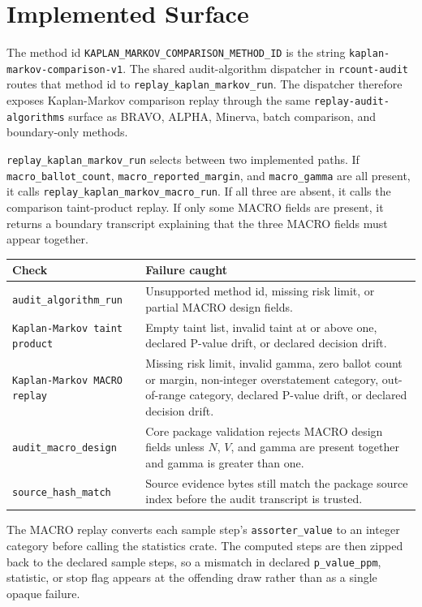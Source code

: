 \section{Implemented Surface}

The method id \texttt{KAPLAN\_MARKOV\_COMPARISON\_METHOD\_ID} is the string
\texttt{kaplan-markov-comparison-v1}. The shared audit-algorithm dispatcher in
\texttt{rcount-audit} routes that method id to
\texttt{replay\_kaplan\_markov\_run}. The dispatcher therefore exposes
Kaplan-Markov comparison replay through the same
\texttt{replay-audit-algorithms} surface as BRAVO, ALPHA, Minerva, batch
comparison, and boundary-only methods.

\texttt{replay\_kaplan\_markov\_run} selects between two implemented paths. If
\texttt{macro\_ballot\_count}, \texttt{macro\_reported\_margin}, and
\texttt{macro\_gamma} are all present, it calls
\texttt{replay\_kaplan\_markov\_macro\_run}. If all three are absent, it calls
the comparison taint-product replay. If only some MACRO fields are present, it
returns a boundary transcript explaining that the three MACRO fields must appear
together.

\begin{center}
\small
\begin{tabularx}{\textwidth}{lX}
\toprule
Check & Failure caught \\
\midrule
\texttt{audit\_algorithm\_run} & Unsupported method id, missing risk limit, or partial MACRO design fields. \\
\texttt{Kaplan-Markov taint product} & Empty taint list, invalid taint at or above one, declared P-value drift, or declared decision drift. \\
\texttt{Kaplan-Markov MACRO replay} & Missing risk limit, invalid gamma, zero ballot count or margin, non-integer overstatement category, out-of-range category, declared P-value drift, or declared decision drift. \\
\texttt{audit\_macro\_design} & Core package validation rejects MACRO design fields unless $N$, $V$, and gamma are present together and gamma is greater than one. \\
\texttt{source\_hash\_match} & Source evidence bytes still match the package source index before the audit transcript is trusted. \\
\bottomrule
\end{tabularx}
\end{center}

The MACRO replay converts each sample step's \texttt{assorter\_value} to an
integer category before calling the statistics crate. The computed steps are
then zipped back to the declared sample steps, so a mismatch in declared
\texttt{p\_value\_ppm}, statistic, or stop flag appears at the offending draw
rather than as a single opaque failure.
